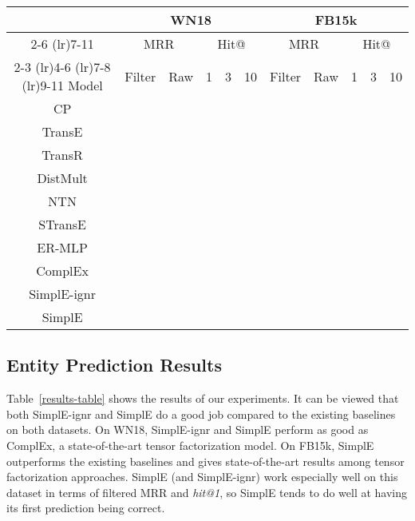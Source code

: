 \documentclass{article}
\begin{document}
\begin{table*}[t]
\scriptsize
\caption{Results on WN18 and FB15k. Best results are in bold.}
\label{results-table}
\begin{center}
\begin{tabular}{ccccccccccc}
\toprule
& \multicolumn{5}{c}{WN18} & \multicolumn{5}{c}{FB15k}                   \\
\cmidrule(lr){2-6} \cmidrule(lr){7-11}
& \multicolumn{2}{c}{MRR} & \multicolumn{3}{c}{Hit@} & \multicolumn{2}{c}{MRR} & \multicolumn{3}{c}{Hit@} \\
\cmidrule(lr){2-3} \cmidrule(lr){4-6} \cmidrule(lr){7-8} \cmidrule(lr){9-11}
Model & Filter & Raw & 1 & 3 & 10 & Filter & Raw & 1 & 3 & 10 \\ \hline
CP &   &  &  &  &  &  &   &   &  &  \\
TransE &  &  &  &  &  &  &  &  &  &  \\
TransR &  &  &  &  &  &  &  &  &  &  \\
DistMult &   &  &  &  &  &  &  &  &  &  \\
NTN &  &  &  &  &  &  &  &  &  &  \\
STransE &  &  &  &  &  &  &  &  &  &  \\
ER-MLP &  &  &  &  &  &  &  &  &  &  \\
ComplEx &  &  &  &  &  &  &  &  &  &  \\ \hline
SimplE-ignr &  &  &  &  &  &  &  &  &  &  \\
SimplE &  &  &  &  &  &  &  &  &  &   
\end{tabular}
\end{center}
\end{table*}

\subsection{Entity Prediction Results}
Table~\ref{results-table} shows the results of our experiments. It can be viewed that both SimplE-ignr and SimplE do a good job compared to the existing baselines on both datasets. On WN18, SimplE-ignr and SimplE perform as good as ComplEx, a state-of-the-art tensor factorization model. On FB15k, SimplE outperforms the existing baselines and gives state-of-the-art results among tensor factorization approaches. SimplE (and SimplE-ignr) work especially well on this dataset in terms of filtered MRR and \emph{hit@1}, so SimplE tends to do well at having its first prediction being correct. 
\end{document}
